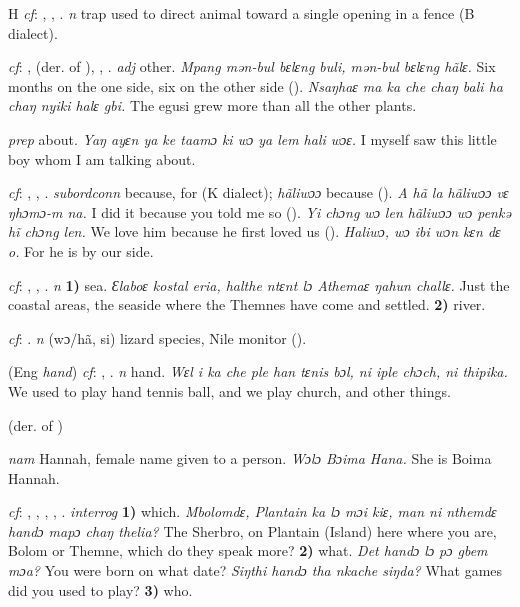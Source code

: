 \begin{letter}{H}
 \textit{cf}: , , . \textit{n} trap used to direct animal toward a single opening in a fence (B dialect). 

 \textit{cf}: ,  (der. of ), , . \textit{adj} other. \textit{Mpang mən-bul bɛlɛng buli, mən-bul bɛlɛng hãlɛ.} Six months on the one side, six on the other side (\citealt{Pichl1967}). \textit{Nsaŋhaɛ ma ka che chaŋ bali ha chaŋ nyiki halɛ gbi.} The egusi grew more than all the other plants.

 \textit{prep} about. \textit{Yaŋ ayɛn ya ke taamɔ ki wɔ ya lem hali wɔɛ.} I myself saw this little boy whom I am talking about.

 \textit{cf}: , , . \textit{subordconn} because, for (K dialect); \textit{hãliwɔɔ} because (\citealt{Pichl1967}). \textit{A hã la hãliwɔɔ vɛ ŋhɔmɔ-m na.} I did it because you told me so (\citealt{Pichl1967}). \textit{Yi chɔng wɔ len hãliwɔɔ wɔ penkə hĩ chɔng len.} We love him because he first loved us (\citealt{Pichl1967}). \textit{Haliwɔ, wɔ ibi wɔn kɛn dɛ o.} For he is by our side.

 \textit{cf}: , , . \textit{n} \textbf{1)} sea. \textit{Ɛlaboɛ kostal eria, halthe ntɛnt lɔ Athemaɛ ŋahun challɛ.} Just the coastal areas, the seaside where the Themnes have come and settled. \textbf{2)} river.

 \textit{cf}: . \textit{n} (wɔ/hã, si) lizard species, Nile monitor (\citealt{Pichl1967}). 

 (Eng \textit{hand}) \textit{cf}: , . \textit{n} hand. \textit{Wɛl i ka che ple han tɛnis bɔl, ni iple chɔch, ni thipika.} We used to play hand tennis ball, and we play church, and other things.

 (der. of ) 

 \textit{nam} Hannah, female name given to a person. \textit{Wɔlɔ Bɔima Hana.} She is Boima Hannah.

 \textit{cf}: , , , , . \textit{interrog} \textbf{1)} which. \textit{Mbolomdɛ, Plantain ka lɔ mɔi kiɛ, man ni nthemdɛ handɔ mapɔ chaŋ thelia?} The Sherbro, on Plantain (Island) here where you are, Bolom or Themne, which do they speak more? \textbf{2)} what. \textit{Det handɔ lɔ pɔ gbem mɔa?} You were born on what date? \textit{Siŋthi handɔ tha nkache siŋda?} What games did you used to play? \textbf{3)} who.


\end{letter}
